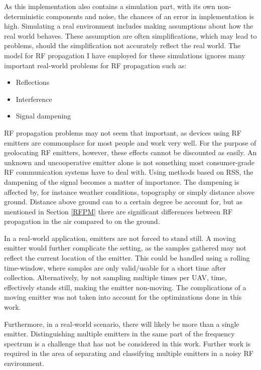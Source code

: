 \documentclass[10pt,a4paper]{book}
\begin{document}
As this implementation also contains a simulation part, with its own non-deterministic components and noise, the chances of an error in implementation is high. Simulating a real environment includes making assumptions about how the real world behaves. These assumption are often simplifications, which may lead to problems, should the simplification not accurately reflect the real world. The model for \gls{RF} propagation I have employed for these simulations ignores many important real-world problems for \gls{RF} propagation such as:

\begin{itemize}
\item Reflections
\item Interference
\item Signal dampening
\end{itemize}

\newpage

\gls{RF} propagation problems may not seem that important, as devices using \gls{RF} emitters are commonplace for most people and work very well. For the purpose of geolocating \gls{RF} emitters, however, these effects cannot be discounted as easily. An unknown and uncooperative emitter alone is not something most consumer-grade \gls{RF} communication systems have to deal with. Using methods based on \gls{RSS}, the dampening of the signal becomes a matter of importance. The dampening is affected by, for instance weather conditions, topography or simply distance above ground. Distance above ground can to a certain degree be account for, but as mentioned in Section \ref{RFPM} there are significant differences between \gls{RF} propagation in the air compared to on the ground.

In a real-world application, emitters are not forced to stand still. A moving emitter would further complicate the setting, as the samples gathered may not reflect the current location of the emitter. This could be handled using a rolling time-window, where samples are only valid/usable for a short time after collection. Alternatively, by not sampling multiple times per \gls{UAV}, time, effectively stands still, making the emitter non-moving. The complications of a moving emitter was not taken into account for the optimizations done in this work. 

Furthermore, in a real-world scenario, there will likely be more than a single emitter. Distinguishing multiple emitters in the same part of the frequency spectrum is a challenge that has not be considered in this work. Further work is required in the area of separating and classifying multiple emitters in a noisy \gls{RF} environment.
\end{document}

